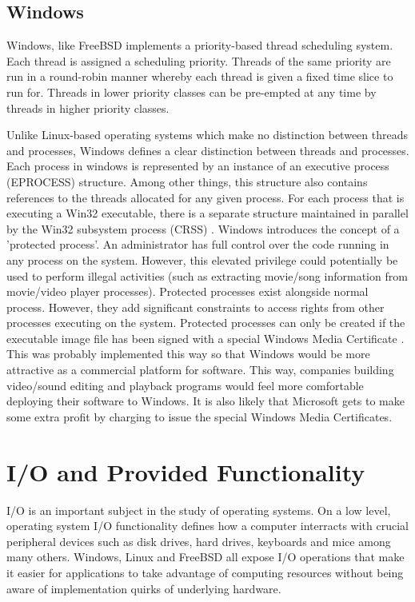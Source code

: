 \documentclass[onecolumn,10pt]{IEEETran}
\begin{document}
\subsection{Windows}
Windows, like FreeBSD implements a priority-based thread scheduling system.  Each thread is assigned a scheduling priority.  Threads of the same priority are run in a round-robin manner whereby each thread is given a fixed time slice to run for.  Threads in lower priority classes can be pre-empted at any time by threads in higher priority classes.

Unlike Linux-based operating systems which make no distinction between threads and processes, Windows defines a clear distinction between threads and processes.  Each process in windows is represented by an instance of an executive process (EPROCESS) structure.  Among other things, this structure also contains references to the threads allocated for any given process.  For each process that is executing a Win32 executable, there is a separate structure maintained in parallel by the Win32 subsystem process (CRSS) \cite{windows}.
	Windows introduces the concept of a 'protected process'.  An administrator has full control over the code running in any process on the system.  However, this elevated privilege could potentially be used to perform illegal activities (such as extracting movie/song information from movie/video player processes).  Protected processes exist alongside normal process.  However, they add significant constraints to access rights from other processes executing on the system.  Protected processes can only be created if the executable image file has been signed with a special Windows Media Certificate \cite{windows}.  This was probably implemented this way so that Windows would be more attractive as a commercial platform for software.  This way, companies building video/sound editing and playback programs would feel more comfortable deploying their software to Windows.  It is also likely that Microsoft gets to make some extra profit by charging to issue the special Windows Media Certificates.

\section{I/O and Provided Functionality}

I/O is an important subject in the study of operating systems.  On a low level, operating system I/O functionality defines how a computer interracts with crucial peripheral devices such as disk drives, hard drives, keyboards and mice among many others.  Windows, Linux and FreeBSD all expose I/O operations that make it easier for applications to take advantage of computing resources without being aware of implementation quirks of underlying hardware.
\end{document}

